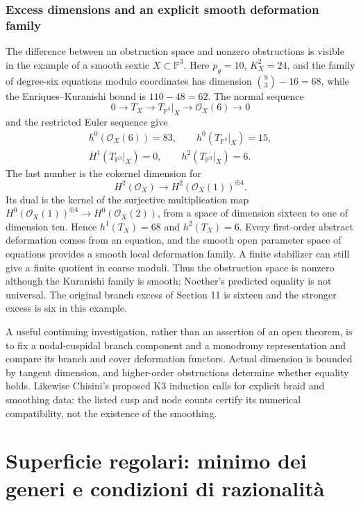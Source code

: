 \subsection{Excess dimensions and an explicit smooth deformation family}

The difference between an obstruction space and nonzero obstructions is visible in the example of a smooth sextic \(X\subset\mathbb P^3\). Here \(p_g=10\), \(K_X^2=24\), and the family of degree-six equations modulo coordinates has dimension \(\binom93-16=68\), while the Enriques--Kuranishi bound is \(110-48=62\). The normal sequence \[
0\longrightarrow T_X\longrightarrow T_{\mathbb P^3}|_X
\longrightarrow\mathcal O_X(6)\longrightarrow0
\] and the restricted Euler sequence give \[
\begin{gathered}
h^0(\mathcal O_X(6))=83,\qquad h^0(T_{\mathbb P^3}|_X)=15,\\
H^1(T_{\mathbb P^3}|_X)=0,\qquad h^2(T_{\mathbb P^3}|_X)=6.
\end{gathered}
\] The last number is the cokernel dimension for \[
H^2(\mathcal O_X)\longrightarrow H^2(\mathcal O_X(1))^{\oplus4}.
\] Its dual is the kernel of the surjective multiplication map \(H^0(\mathcal O_X(1))^{\oplus4}\to H^0(\mathcal O_X(2))\), from a space of dimension sixteen to one of dimension ten. Hence \(h^1(T_X)=68\) and \(h^2(T_X)=6\). Every first-order abstract deformation comes from an equation, and the smooth open parameter space of equations provides a smooth local deformation family. A finite stabilizer can still give a finite quotient in coarse moduli. Thus the obstruction space is nonzero although the Kuranishi family is smooth; Noether's predicted equality is not universal. The original branch excess of Section 11 is sixteen and the stronger excess is six in this example.

A useful continuing investigation, rather than an assertion of an open theorem, is to fix a nodal-cuspidal branch component and a monodromy representation and compare its branch and cover deformation functors. Actual dimension is bounded by tangent dimension, and higher-order obstructions determine whether equality holds. Likewise Chisini's proposed K3 induction calls for explicit braid and smoothing data: the listed cusp and node counts certify its numerical compatibility, not the existence of the smoothing.

\chapter[Superficie regolari]{Superficie regolari: minimo dei generi e condizioni di razionalit\`a}
\label{cp1-ch-vi}

